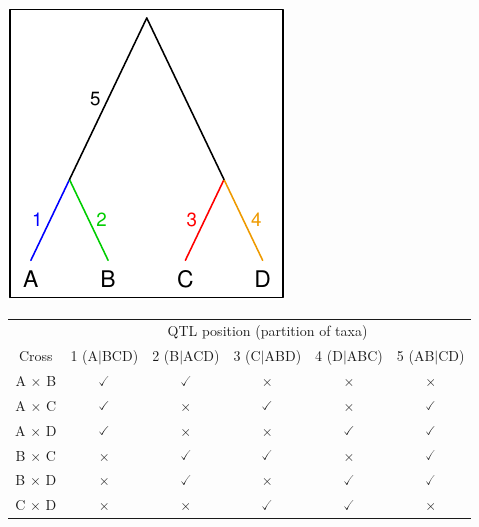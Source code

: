\documentclass[12pt]{article}
\begin{document}
\sffamily

\begin{minipage}[t]{2.05in}
\vspace*{0cm}

\includegraphics{phylotree.pdf}

\end{minipage} \hfill
\begin{minipage}[t]{5.65in}
\vspace*{0cm}

\renewcommand{\arraystretch}{1.2}
\hfill 
\begin{tabular}{cccccc}
\hline 
& \multicolumn{5}{c}{QTL position (partition of taxa)} \\ \cline{2-6}
Cross        & {\color{myblue} 1 (A$|$BCD)} & {\color{mygreen} 2 (B$|$ACD)} & {\color{myred} 3 (C$|$ABD)} & {\color{myorange} 4 (D$|$ABC)} & 5 (AB$|$CD) \\ \hline
A $\times$ B & $\checked$  & $\checked$  & $\times$    & $\times$    & $\times$ \\
A $\times$ C & $\checked$  & $\times$    & $\checked$  & $\times$    & $\checked$ \\ 
A $\times$ D & $\checked$  & $\times$    & $\times$    & $\checked$  & $\checked$ \\ 
B $\times$ C & $\times$    & $\checked$  & $\checked$  & $\times$    & $\checked$ \\ 
B $\times$ D & $\times$    & $\checked$  & $\times$    & $\checked$  & $\checked$ \\ 
C $\times$ D & $\times$    & $\times$    & $\checked$  & $\checked$  & $\times$ \\ 
\hline
\end{tabular}
\renewcommand{\arraystretch}{1.0}
\end{minipage}
\end{document}
